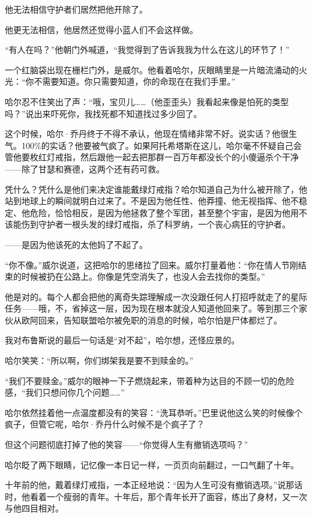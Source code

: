 \documentclass[../main]{subfiles}
\begin{document}
他无法相信守护者们居然把他开除了。

他更无法相信，他居然还觉得小蓝人们不会这样做。

“有人在吗？”他朝门外喊道，“我觉得到了告诉我我为什么在这儿的环节了！”

一个红脑袋出现在栅栏门外，是威尔。他看着哈尔，灰眼睛里是一片暗流涌动的火光：“你不需要知道。你只需要知道，你的命现在在我们手里。”

哈尔忍不住笑出了声：“哦，宝贝儿……（他歪歪头）我看起来像是怕死的类型吗？”说出来吓死你，我找死都不知道找过多少回了。

这个时候，哈尔·乔丹终于不得不承认，他现在情绪非常不好。说实话？他很生气。100\%的实话？他要被气疯了。如果阿托希塔斯在这儿，哈尔毫不怀疑自己会管他要枚红灯戒指，然后跟他一起去把那群一百万年都没长个的小傻逼杀个干净——除了甘瑟和赛德，这两个还有药可救。

凭什么？凭什么是他们来决定谁能戴绿灯戒指？哈尔知道自己为什么被开除了，他站到地球上的瞬间就明白过来了。不是因为他任性、他莽撞、他无视指挥、他不稳定、他危险，恰恰相反，是因为他拯救了整个军团，甚至整个宇宙，是因为他用不该能伤到守护者一根头发的绿灯戒指，杀了科罗纳，一个丧心病狂的守护者。

——是因为他该死的太他妈了不起了。

“你不像。”威尔说道，这把哈尔的思绪拉了回来。威尔打量着他：“你在情人节刚结束的时候被扔在公路上。你像是凭空消失了，也没人会去找你的类型。”

他是对的。每个人都会把他的离奇失踪理解成一次没跟任何人打招呼就走了的星际任务——哦，不，省掉这一层，因为现在根本就没人知道他回来了。等到那三个家伙从欧阿回来，告知联盟哈尔被免职的消息的时候，哈尔怕是尸体都烂了。

我对布鲁斯说的最后一句话是“对不起”，哈尔想，还怪应景的。

哈尔笑笑：“所以啊，你们绑架我是要不到赎金的。”

“我们不要赎金。”威尔的眼神一下子燃烧起来，带着种为达目的不顾一切的危险感，“我们只想问你几个问题……”

哈尔依然挂着他一点温度都没有的笑容：“洗耳恭听。”巴里说他这么笑的时候像个疯子，但管它呢，哈尔·乔丹什么时候不是个疯子了？

但这个问题彻底打掉了他的笑容——“你觉得人生有撤销选项吗？”

哈尔眨了两下眼睛，记忆像一本日记一样，一页页向前翻过，一口气翻了十年。

十年前的他，戴着绿灯戒指，一本正经地说：“因为人生可没有撤销选项。”说那话时，他看着一个瘦弱的青年。十年后，那个青年长开了面容，练出了身材，又一次与他四目相对。
\end{document}

